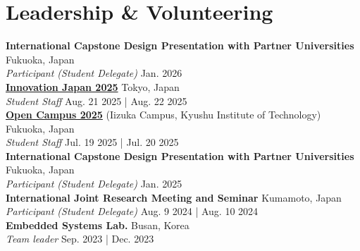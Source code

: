 \documentclass[a4paper,9pt]{extarticle}
\begin{document}
\section*{Leadership \& Volunteering}
\noindent
\large{\textbf{International Capstone Design Presentation with Partner Universities}} \hfill Fukuoka, Japan\\
\textit{Participant (Student Delegate)}  \hfill Jan. 2026 \\

\noindent
\large{\textbf{\href{https://innovationjapan.jst.go.jp}{Innovation Japan 2025}}}  \hfill Tokyo, Japan\\ %
\textit{Student Staff}  \hfill Aug. 21 2025 | Aug. 22 2025  \\%

\noindent
\large{\textbf{\href{https://www.iizuka.kyutech.ac.jp/admissions/open/open2025}{Open Campus 2025}} (Iizuka Campus, Kyushu Institute of Technology)}  \hfill Fukuoka, Japan\\ %
\textit{Student Staff} \hfill Jul. 19 2025 | Jul. 20 2025 \\

\noindent
\large{\textbf{International Capstone Design Presentation with Partner Universities}} \hfill Fukuoka, Japan\\
\textit{Participant (Student Delegate)}  \hfill Jan. 2025 \\

\noindent
\large{\textbf{International Joint Research Meeting and Seminar}} \hfill Kumamoto, Japan \\
\textit{Participant (Student Delegate)} \hfill Aug. 9 2024 | Aug. 10 2024 \\



\noindent
\large{\textbf{Embedded Systems Lab.}}  \hfill Busan, Korea\\ %
\textit{Team leader} \hfill Sep. 2023 | Dec. 2023%
\\
\end{document}

